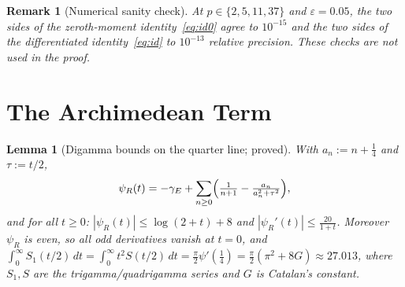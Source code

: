 \documentclass[11pt]{article}
\newtheorem{lemma}[theorem]{Lemma}
\newtheorem*{remark}{Remark}
\newcommand{\psiR}{\psi_{R}}                %
\begin{document}
\begin{remark}[Numerical sanity check]
At $p\in\{2,5,11,37\}$ and $\varepsilon=0.05$, the two sides of the
zeroth-moment identity~\eqref{eq:id0} agree to $10^{-15}$ and the two sides
of the differentiated identity~\eqref{eq:id} to $10^{-13}$ relative
precision. These checks are not used in the proof.
\end{remark}

\section{The Archimedean Term}
\label{sec:arch}

\begin{lemma}[Digamma bounds on the quarter line; proved]
\label{lem:psi}
With $a_n:=n+\tfrac14$ and $\tau:=t/2$,
\[
\psiR(t) = -\gamma_E+\sum_{n\ge 0}
   \Bigl(\tfrac{1}{n+1}-\tfrac{a_n}{a_n^2+\tau^2}\Bigr),
\]
and for all $t\ge 0$:
$|\psiR(t)|\le\log(2+t)+8$ and
$|\psiR'(t)|\le\tfrac{20}{1+t}$.
Moreover $\psiR$ is even, so all odd derivatives vanish at $t=0$, and
$\int_0^\infty S_1(t/2)\,dt=\int_0^\infty t^2 S(t/2)\,dt
=\tfrac{\pi}{2}\psi'(\tfrac14)=\tfrac{\pi}{2}(\pi^2+8G)\approx 27.013$,
where $S_1,S$ are the trigamma/quadrigamma series and $G$ is Catalan's
constant.
\end{lemma}
\end{document}

